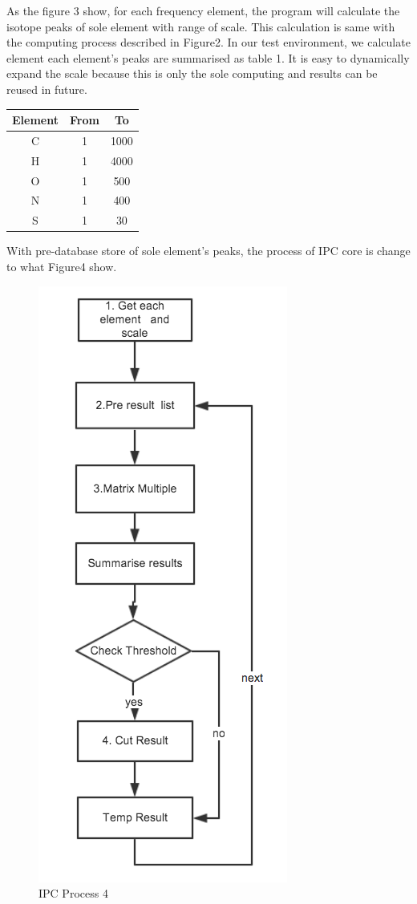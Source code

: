 \documentclass[letterpaper,twocolumn,10pt]{article}
\begin{document}
As the figure 3 show, for each frequency element, the program will calculate the isotope peaks of sole element with range of scale. This calculation is same with the computing process described in Figure2. In our test environment, we calculate element each element's peaks are summarised as table 1. It is easy to dynamically expand the scale because this is only the sole computing and results can be reused in future.

\begin{center}
\begin{tabular}{c|c|c}
\hline
Element & From & To\\
\hline
C & 1 & 1000\\
\hline
H & 1 & 4000\\
\hline
O & 1 & 500\\
\hline
N & 1 & 400\\
\hline
S & 1 & 30\\
\end{tabular}
\end{center}

With pre-database store of sole element's peaks, the process of IPC core is change to what Figure4 show.

\begin{figure}[h!]
\centering
\includegraphics[scale=0.45]{ipc04}
\caption{IPC Process 4}
\label{threadsVsSync}
\end{figure}
\end{document}
